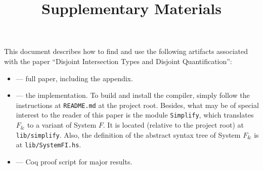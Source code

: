 \documentclass{article}
\begin{document}
\title{Supplementary Materials}
\maketitle

This document describes how to find and use the following artifacts associated
with the paper ``Disjoint Intersection Types and Disjoint Quantification'':

\begin{itemize}
  \item {} --- full paper, including the appendix.

  \item {} --- the implementation. To build and install the
  compiler, simply follow the instructions at \texttt{README.md} at the project
  root. Besides, what may be of special interest to the reader of this paper is
  the module \texttt{Simplify}, which translates $ F_\&$ to a variant of System
  $F$. It is located (relative to the project root) at \texttt{lib/simplify}.
  Also, the definition of the abstract syntax tree of System $F_\&$ is at
  \texttt{lib/SystemFI.hs}.

  \item {} --- Coq proof script for major results.
\end{itemize}
\end{document}
